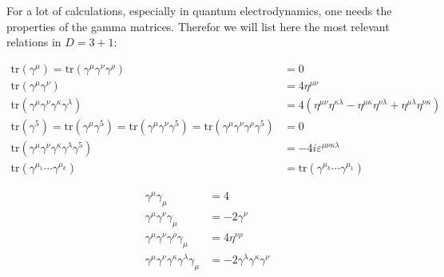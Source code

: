 	For a lot of calculations, especially in quantum electrodynamics, one needs the properties of the gamma matrices. Therefor we will list here the most relevant relations in $D=3+1$:
	\begin{formula}
		\begin{align}
			\text{tr}(\gamma^\mu) = \text{tr}(\gamma^\mu\gamma^\nu\gamma^\rho) &= 0\\
			\text{tr}(\gamma^\mu\gamma^\nu) &= 4\eta^{\mu\nu}\\
			\text{tr}(\gamma^\mu\gamma^\nu\gamma^\kappa\gamma^\lambda) &= 4(\eta^{\mu\nu}\eta^{\kappa\lambda} - \eta^{\mu\kappa}\eta^{\nu\lambda} + \eta^{\mu\lambda}\eta^{\nu\kappa})\\
			\text{tr}(\gamma^5) = \text{tr}(\gamma^\mu\gamma^5) = \text{tr}(\gamma^\mu\gamma^\nu\gamma^5) = \text{tr}(\gamma^\mu\gamma^\nu\gamma^\rho\gamma^5)&= 0\\
			\text{tr}(\gamma^\mu\gamma^\nu\gamma^\kappa\gamma^\lambda\gamma^5) &= -4i\varepsilon^{\mu\nu\kappa\lambda}\\
			\text{tr}(\gamma^{\mu_1}\cdots\gamma^{\mu_k}) &= \text{tr}(\gamma^{\mu_k}\cdots\gamma^{\mu_1})
		\end{align}
	\end{formula}
	
	\begin{formula}
		\begin{align}
			\gamma^\mu\gamma_\mu &= 4\\
			\gamma^\mu\gamma^\nu\gamma_\mu &= -2\gamma^\nu\\
			\gamma^\mu\gamma^\nu\gamma^\rho\gamma_\mu &= 4\eta^{\nu\rho}\\
			\gamma^\mu\gamma^\nu\gamma^\kappa\gamma^\lambda\gamma_\mu &= -2\gamma^\lambda\gamma^\kappa\gamma^\nu
		\end{align}
	\end{formula}
